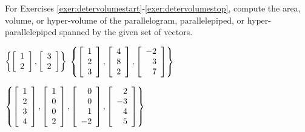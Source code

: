 \noindent For Exercises \ref{exer:detervolumestart}-\ref{exer:detervolumestop}, compute the area, volume, or hyper-volume of the parallelogram, parallelepiped, or hyper-parallelepiped spanned by the given set of vectors. 
\begin{enumerate}[!HW!, label=$\spadesuit$ \arabic*., ref=\arabic*]
\begin{multicols}{3}
\item\label{exer:detervolumestart} $\left\{\vr{1 \\ 2}, \vr{3\\2}\right\}$ 
\itemspade $\left\{\vr{1 \\ 2 \\ 3}, \vr{4\\8\\2}, \vr{-2 \\ 3 \\ 7}\right\}$
\item\label{exer:detervolumestop} $\left\{\vr{1 \\ 2 \\ 3 \\ 4}, \vr{1 \\ 0 \\ 0 \\ 2}, \vr{0 \\ 0 \\ 1 \\-2}, \vr{2\\-3\\4\\5}\right\}$
\end{multicols}
\end{enumerate}


 \mbox{}\vfill
 
\pagebreak